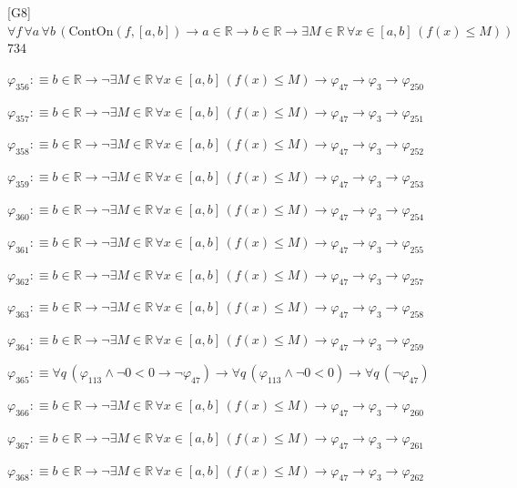 \begin{fullproof}{[G8]}{$\forall f\,\forall a\,\forall b\,(\mathrm{ContOn}(f,[a,b]) \to a \in \mathbb{R} \to b \in \mathbb{R} \to \exists M \in \mathbb{R}\,\forall x \in [a,b]\,(f(x) \leq M))$}{734}
\begin{abbrevlist}
\item $\varphi_{356} :\equiv b \in \mathbb{R} \to \neg \exists M \in \mathbb{R}\,\forall x \in [a,b]\,(f(x) \leq M) \to \varphi_{47} \to \varphi_{3} \to \varphi_{250}$
\item $\varphi_{357} :\equiv b \in \mathbb{R} \to \neg \exists M \in \mathbb{R}\,\forall x \in [a,b]\,(f(x) \leq M) \to \varphi_{47} \to \varphi_{3} \to \varphi_{251}$
\item $\varphi_{358} :\equiv b \in \mathbb{R} \to \neg \exists M \in \mathbb{R}\,\forall x \in [a,b]\,(f(x) \leq M) \to \varphi_{47} \to \varphi_{3} \to \varphi_{252}$
\item $\varphi_{359} :\equiv b \in \mathbb{R} \to \neg \exists M \in \mathbb{R}\,\forall x \in [a,b]\,(f(x) \leq M) \to \varphi_{47} \to \varphi_{3} \to \varphi_{253}$
\item $\varphi_{360} :\equiv b \in \mathbb{R} \to \neg \exists M \in \mathbb{R}\,\forall x \in [a,b]\,(f(x) \leq M) \to \varphi_{47} \to \varphi_{3} \to \varphi_{254}$
\item $\varphi_{361} :\equiv b \in \mathbb{R} \to \neg \exists M \in \mathbb{R}\,\forall x \in [a,b]\,(f(x) \leq M) \to \varphi_{47} \to \varphi_{3} \to \varphi_{255}$
\item $\varphi_{362} :\equiv b \in \mathbb{R} \to \neg \exists M \in \mathbb{R}\,\forall x \in [a,b]\,(f(x) \leq M) \to \varphi_{47} \to \varphi_{3} \to \varphi_{257}$
\item $\varphi_{363} :\equiv b \in \mathbb{R} \to \neg \exists M \in \mathbb{R}\,\forall x \in [a,b]\,(f(x) \leq M) \to \varphi_{47} \to \varphi_{3} \to \varphi_{258}$
\item $\varphi_{364} :\equiv b \in \mathbb{R} \to \neg \exists M \in \mathbb{R}\,\forall x \in [a,b]\,(f(x) \leq M) \to \varphi_{47} \to \varphi_{3} \to \varphi_{259}$
\item $\varphi_{365} :\equiv \forall q\,(\varphi_{113} \land \neg 0 < 0 \to \neg \varphi_{47}) \to \forall q\,(\varphi_{113} \land \neg 0 < 0) \to \forall q\,(\neg \varphi_{47})$
\item $\varphi_{366} :\equiv b \in \mathbb{R} \to \neg \exists M \in \mathbb{R}\,\forall x \in [a,b]\,(f(x) \leq M) \to \varphi_{47} \to \varphi_{3} \to \varphi_{260}$
\item $\varphi_{367} :\equiv b \in \mathbb{R} \to \neg \exists M \in \mathbb{R}\,\forall x \in [a,b]\,(f(x) \leq M) \to \varphi_{47} \to \varphi_{3} \to \varphi_{261}$
\item $\varphi_{368} :\equiv b \in \mathbb{R} \to \neg \exists M \in \mathbb{R}\,\forall x \in [a,b]\,(f(x) \leq M) \to \varphi_{47} \to \varphi_{3} \to \varphi_{262}$

\end{abbrevlist}
\end{fullproof}
